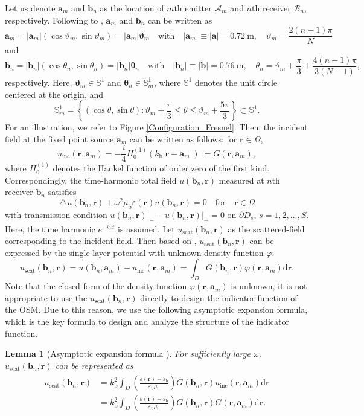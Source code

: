 \documentclass[3p,10pt]{elsarticle}
\newcommand{\eps}{\varepsilon}
\newcommand{\kb}{k_{\mathrm{b}}}
\newcommand{\epsb}{\varepsilon_{\mathrm{b}}}
\newcommand{\mub}{\mu_{\mathrm{b}}}
\newcommand{\set}[1]{\left\{#1\right\}}
\newcommand{\p}{\partial}
\newcommand{\rd}{\mathrm{d}}
\newcommand{\ma}{\mathbf{a}}
\newcommand{\mb}{\mathbf{b}}
\newcommand{\mr}{\mathbf{r}}
\newcommand{\mA}{\mathcal{A}}
\newcommand{\mB}{\mathcal{B}}
\newcommand{\vt}{\boldsymbol{\theta}}
\newcommand{\vv}{\boldsymbol{\vartheta}}
\DeclareMathOperator*{\inc}{inc}
\DeclareMathOperator*{\scat}{scat}
\theoremstyle{plain}
\newtheorem{lemma}{Lemma}[section]
\theoremstyle{remark}
\begin{document}
Let us denote $\ma_m$ and $\mb_n$ as the location of $m$th emitter $\mA_m$ and $n$th receiver $\mB_n$, respectively. Following to \cite{BS}, $\ma_m$ and $\mb_n$ can be written as
\[\ma_m=|\ma_m|(\cos\vartheta_m,\sin\vartheta_m)=|\ma_m|\vv_m\quad\text{with}\quad|\ma_m|\equiv|\ma|=\SI{0.72}{\meter},\quad\vartheta_m=\frac{2(n-1)\pi}{N}\]
and
\[\mb_n=|\mb_n|(\cos\theta_n,\sin\theta_n)=|\mb_n|\vt_n\quad\text{with}\quad|\mb_n|\equiv|\mb|=\SI{0.76}{\meter},\quad\theta_n=\vartheta_m+\frac{\pi}{3}+\frac{4(n-1)\pi}{3(N-1)},\]
respectively. Here, $\vv_m\in\mathbb{S}^1$ and $\vt_n\in\mathbb{S}_m^1$, where $\mathbb{S}^1$ denotes the unit circle centered at the origin, and
\[\mathbb{S}_m^1=\set{(\cos\theta,\sin\theta):\vartheta_m+\frac{\pi}{3}\leq\theta\leq\vartheta_m+\frac{5\pi}{3}}\subset\mathbb{S}^1.\]
For an illustration, we refer to Figure \ref{Configuration_Fresnel}. Then, the incident field at the fixed point source $\ma_m$ can be written as follows: for $\mr\in\Omega$,
\[u_{\inc}(\mr,\ma_m)=-\frac{i}{4}H_0^{(1)}(\kb|\mr-\ma_m|):=G(\mr,\ma_m),\]
where $H_0^{(1)}$ denotes the Hankel function of order zero of the first kind. Correspondingly, the time-harmonic total field $u(\mb_n,\mr)$ measured at $n$th receiver $\mb_n$ satisfies
\[\triangle u(\mb_n,\mr)+\omega^2\mub\eps(\mr)u(\mb_n,\mr)=0\quad\text{for}\quad\mr\in\Omega\]
with transmission condition $u(\mb_n,\mr)\big|_--u(\mb_n,\mr)\big|_+=0$ on $\p D_s$, $s=1,2,\ldots,S$. Here, the time harmonic $e^{-i\omega t}$ is assumed. Let $u_{\scat}(\mb_n,\mr)$ as the scattered-field corresponding to the incident field. Then based on \cite{CK}, $u_{\scat}(\mb_n,\mr)$ can be expressed by the single-layer potential with unknown density function $\varphi$:
\[u_{\scat}(\mb_n,\mr)=u(\mb_n,\ma_m)-u_{\inc}(\mr,\ma_m)=\int_D G(\mb_n,\mr)\varphi(\mr,\ma_m)\rd\mr.\]
Note that the closed form of the density function $\varphi(\mr,\ma_m)$ is unknown, it is not appropriate to use the $u_{\scat}(\mb_n,\mr)$ directly to design the indicator function of the OSM. Due to this reason, we use the following asymptotic expansion formula, which is the key formula to design and analyze the structure of the indicator function.

\begin{lemma}[Asymptotic expansion formula \cite{AK2,CV}] For sufficiently large $\omega$, $u_{\scat}(\mb_n,\mr)$ can be represented as
\begin{align}
\begin{aligned}\label{AsymptoticFormula}
u_{\scat}(\mb_n,\mr)&=\kb^2\int_D\left(\frac{\eps(\mr)-\epsb}{\epsb\mub}\right)G(\mb_n,\mr)u_{\inc}(\mr,\ma_m)\rd\mr\\
&=\kb^2\int_D\left(\frac{\eps(\mr)-\epsb}{\epsb\mub}\right)G(\mb_n,\mr)G(\mr,\ma_m)\rd\mr.
\end{aligned}
\end{align}
\end{lemma}
\end{document}
